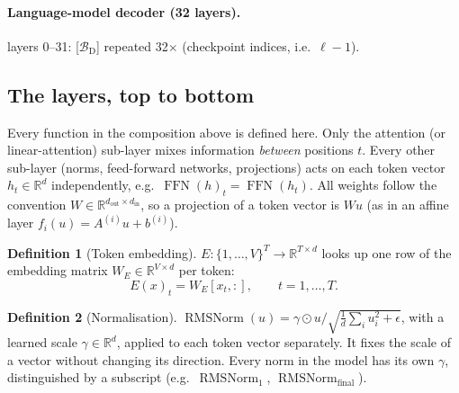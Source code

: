 \documentclass[10pt,a4paper]{article}
\newcommand{\op}[1]{\operatorname{#1}}
\theoremstyle{definition}
\newtheorem{definition}{Definition}[section]
\begin{document}
\paragraph{Language-model decoder (32 layers).} 
layers 0--31: [$\mathcal{B}_{\mathrm{D}}$] repeated 32$\times$ (checkpoint indices, i.e.\ $\ell-1$).
\subsection{The layers, top to bottom}\label{sec:layers}
Every function in the composition above is defined here. Only the attention (or linear-attention) sub-layer mixes information \emph{between} positions $t$. Every other sub-layer (norms, feed-forward networks, projections) acts on each token vector $h_t\in\mathbb{R}^{d}$ independently, e.g.\ $\op{FFN}(h)_t=\op{FFN}(h_t)$. All weights follow the convention $W\in\mathbb{R}^{d_{\mathrm{out}}\times d_{\mathrm{in}}}$, so a projection of a token vector is $W u$ (as in an affine layer $f_i(u)=A^{(i)}u+b^{(i)}$).
\begin{definition}[Token embedding]\label{def:embed}
$E:\{1,\dots,V\}^{T}\to\mathbb{R}^{T\times d}$ looks up one row of the embedding matrix $W_E\in\mathbb{R}^{V\times d}$ per token:
\begin{equation}
  E(x)_t = W_E[x_t,:],\qquad t=1,\dots,T.
\end{equation}
\end{definition}
\begin{definition}[Normalisation]
$\op{RMSNorm}(u)=\gamma\odot u/\sqrt{\tfrac1d\sum_i u_i^2+\epsilon}$, with a learned scale $\gamma\in\mathbb{R}^{d}$, applied to each token vector separately. It fixes the scale of a vector without changing its direction. Every norm in the model has its own $\gamma$, distinguished by a subscript (e.g.\ $\op{RMSNorm}_1$, $\op{RMSNorm}_{\mathrm{final}}$).
\end{definition}
\end{document}
